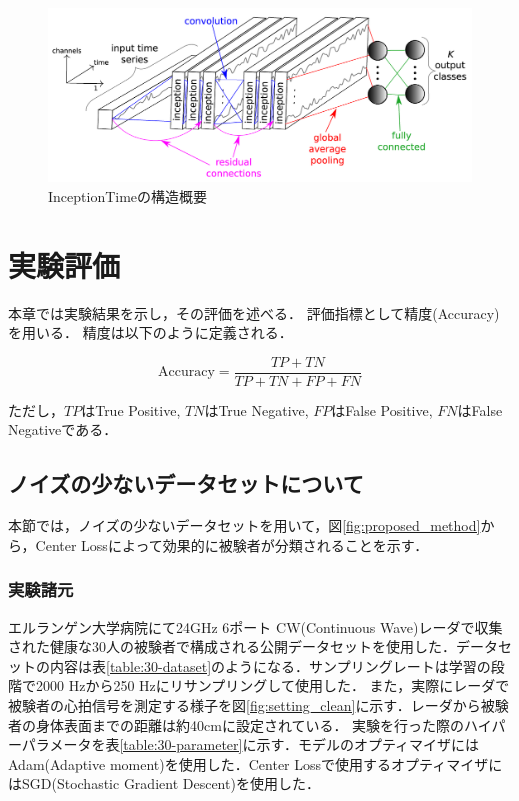 \begin{figure}[H]
\begin{center}
\includegraphics[width=\linewidth]{./fig/InceptionTime.png}
\end{center}
\caption{InceptionTimeの構造概要}
\label{fig:InceptionTime}
\end{figure}

\chapter{実験評価}
本章では実験結果を示し，その評価を述べる．
評価指標として精度(Accuracy)を用いる．
精度は以下のように定義される．

\begin{equation}\label{}
\mathrm{Accuracy} = \frac{TP + TN}{TP + TN + FP + FN}
\end{equation}

ただし，$TP$はTrue Positive, $TN$はTrue Negative, $FP$はFalse Positive, $FN$はFalse Negativeである．

\section{ノイズの少ないデータセットについて}
本節では，ノイズの少ないデータセットを用いて，図\ref{fig:proposed_method}から，Center Lossによって効果的に被験者が分類されることを示す．
\subsection{実験諸元}
エルランゲン大学病院にて24GHz 6ポート CW(Continuous Wave)レーダで収集された健康な30人の被験者で構成される公開データセットを使用した\cite{paper:30-dataset}．データセットの内容は表\ref{table:30-dataset}のようになる．サンプリングレートは学習の段階で2000 Hzから250 Hzにリサンプリングして使用した．
また，実際にレーダで被験者の心拍信号を測定する様子を図\ref{fig:setting_clean}に示す．レーダから被験者の身体表面までの距離は約40cmに設定されている．
実験を行った際のハイパーパラメータを表\ref{table:30-parameter}に示す．モデルのオプティマイザにはAdam(Adaptive moment)を使用した．Center Lossで使用するオプティマイザにはSGD(Stochastic Gradient Descent)を使用した．

